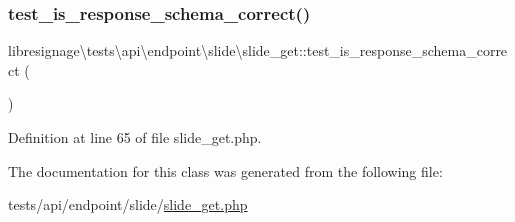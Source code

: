 \subsubsection{\texorpdfstring{test\+\_\+is\+\_\+response\+\_\+schema\+\_\+correct()}{test\_is\_response\_schema\_correct()}}
{\footnotesize\ttfamily libresignage\textbackslash{}tests\textbackslash{}api\textbackslash{}endpoint\textbackslash{}slide\textbackslash{}slide\+\_\+get\+::test\+\_\+is\+\_\+response\+\_\+schema\+\_\+correct (\begin{DoxyParamCaption}{ }\end{DoxyParamCaption})}



Definition at line 65 of file slide\+\_\+get.\+php.



The documentation for this class was generated from the following file\+:\begin{DoxyCompactItemize}
\item 
tests/api/endpoint/slide/\hyperlink{tests_2api_2endpoint_2slide_2slide__get_8php}{slide\+\_\+get.\+php}\end{DoxyCompactItemize}
